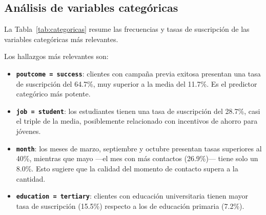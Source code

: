\documentclass[conference]{IEEEtran}
\begin{document}
\subsection{Análisis de variables categóricas}

La Tabla~\ref{tab:categoricas} resume las frecuencias y tasas de suscripción de las variables categóricas más relevantes.

\begin{table}[H]
\caption{Tasa de suscripción por categorías seleccionadas}
\label{tab:categoricas}
\centering
{}
\end{table}

Los hallazgos más relevantes son:

\begin{itemize}
    \item \textbf{\texttt{poutcome = success}}: clientes con campaña previa exitosa presentan una tasa de suscripción del 64.7\%, muy superior a la media del 11.7\%. Es el predictor categórico más potente.
    \item \textbf{\texttt{job = student}}: los estudiantes tienen una tasa de suscripción del 28.7\%, casi el triple de la media, posiblemente relacionado con incentivos de ahorro para jóvenes.
    \item \textbf{\texttt{month}}: los meses de marzo, septiembre y octubre presentan tasas superiores al 40\%, mientras que mayo —el mes con más contactos (26.9\%)— tiene solo un 8.0\%. Esto sugiere que la calidad del momento de contacto supera a la cantidad.
    \item \textbf{\texttt{education = tertiary}}: clientes con educación universitaria tienen mayor tasa de suscripción (15.5\%) respecto a los de educación primaria (7.2\%).
\end{itemize}
\end{document}
